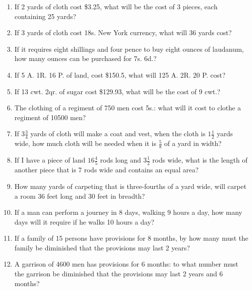 \documentclass[12pt]{article}
\begin{document}
\begin{enumerate}
\item If 2 yards of cloth cost \$3.25, what will be the cost of 3 pieces, each containing 25 yards? 
\spacing

\item If 3 yards of cloth cost 18s. New York currency, what will 36 yards cost? 
\spacing

\item If it requires eight shillings and four pence to buy eight ounces of laudanum, how many ounces can be purchased for 7s. 6d.? 
\spacing

\item If 5 A. 1R. 16 P. of land, cost \$150.5, what will 125 A. 2R. 20 P. cost? 
\spacing

\item If 13 cwt. 2qr. of sugar cost \$129.93, what will be the cost of 9 cwt.? 
\spacing

\item The clothing of a regiment of 750 men cost  5s.: what will it cost to clothe a regiment of 10500 men? 
\spacing

\item If $3\frac{3}{4}$ yards of cloth will make a coat and vest, when the cloth is $1\frac{1}{2}$ yards wide, how much cloth will be needed when it is $\frac{5}{8}$ of a yard in width? 
\spacing

\item If I have a piece of land $16\frac{4}{5}$ rods long and $3\frac{1}{2}$ rods wide, what is the length of another piece that is 7 rods wide and contains an equal area? 
\spacing

\item How many yards of carpeting that is three-fourths of a yard wide, will carpet a room 36 feet long and 30 feet in breadth? 
\spacing

\item If a man can perform a journey in 8 days, walking 9 hours a day, how many days will it require if he walks 10 hours a day? 
\spacing

\item If a family of 15 persons have provisions for 8 months, by how many must the family be diminished that the provisions may last 2 years? 
\spacing

\item A garrison of 4600 men has provisions for 6 months: to what number must the garrison be diminished that the provisions may last 2 years and 6 months? 
\spacing


\end{enumerate}
\end{document}
